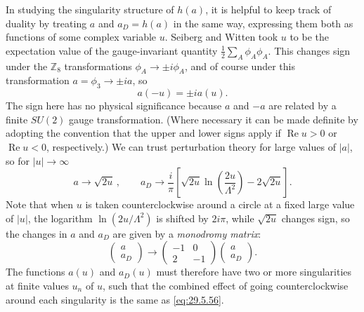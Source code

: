 In studying the singularity structure of \(h(a)\), it is helpful to keep
track of duality by treating \(a\) and \(a_D=h(a)\) in the same way,
expressing them both as functions of some complex variable \(u\). Seiberg
and Witten took \(u\) to be the expectation value of the gauge-invariant
quantity \(\tfrac12\sum_A\phi_A\phi_A\). This changes sign under the
\(\mathbb{Z}_8\) transformations \(\phi_A\longrightarrow\pm i\phi_A\), and
of course under this transformation \(a=\phi_3\longrightarrow\pm ia\), so
\begin{equation}
  a(-u)=\pm ia(u).
  \tag{29.5.54}\label{eq:29.5.54}
\end{equation}
The sign here has no physical significance because \(a\) and \(-a\) are
related by a finite \(SU(2)\) gauge transformation. (Where necessary it can
be made definite by adopting the convention that the upper and lower signs
apply if \(\operatorname{Re}u>0\) or \(\operatorname{Re}u<0\),
respectively.) We can trust perturbation theory for large values of
\(\lvert a\rvert\), so for \(\lvert u\rvert\longrightarrow\infty\)
\begin{equation}
  a\longrightarrow\sqrt{2u}\,,
  \qquad
  a_D\longrightarrow\frac{i}{\pi}\left[
    \sqrt{2u}\ln\left(\frac{2u}{\Lambda^2}\right)-2\sqrt{2u}
  \right].
  \tag{29.5.55}\label{eq:29.5.55}
\end{equation}
Note that when \(u\) is taken counterclockwise around a circle at a fixed
large value of \(\lvert u\rvert\), the logarithm
\(\ln(2u/\Lambda^2)\) is shifted by \(2i\pi\), while \(\sqrt{2u}\) changes
sign, so the changes in \(a\) and \(a_D\) are given by a \textit{monodromy
matrix}:
\begin{equation}
  \begin{pmatrix}
    a\\ a_D
  \end{pmatrix}
  \longrightarrow
  \begin{pmatrix}
    -1&0\\ 2&-1
  \end{pmatrix}
  \begin{pmatrix}
    a\\ a_D
  \end{pmatrix}.
  \tag{29.5.56}\label{eq:29.5.56}
\end{equation}
The functions \(a(u)\) and \(a_D(u)\) must therefore have two or more
singularities at finite values \(u_n\) of \(u\), such that the combined
effect of going counterclockwise around each singularity is the same as
\eqref{eq:29.5.56}.

